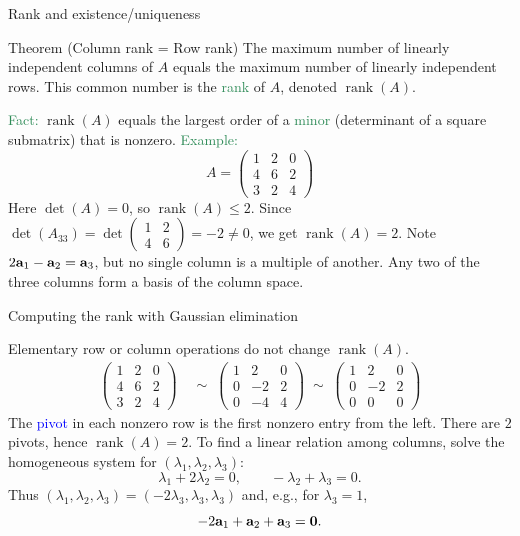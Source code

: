 \documentclass[11pt,aspectratio=169]{beamer}
\DeclareMathOperator{\rank}{rank}
\begin{document}
\begin{frame}{Rank and existence/uniqueness}
 \begin{alertblock}{Theorem (Column rank = Row rank)}
 	The maximum number of linearly independent columns of $A$ equals the maximum number of linearly independent rows. This common number is the \textcolor{SeaGreen}{rank} of $A$, denoted $\rank(A)$.
 \end{alertblock}

\vskip 6pt
\textcolor{SeaGreen}{Fact:} $\rank(A)$ equals the largest order of a \textcolor{SeaGreen}{minor} (determinant of a square submatrix) that is nonzero.
\vskip 8pt
\textcolor{SeaGreen}{Example:}
\[
A=\begin{pmatrix}
1&2&0\\
4&6&2\\
3&2&4
\end{pmatrix}
\]
Here $\det(A)=0$, so $\rank(A)\le 2$. Since $\det(A_{33})=\det\!\begin{pmatrix}1&2\\4&6\end{pmatrix}=-2\ne 0$, we get $\rank(A)=2$.
\vskip 4pt
{\tiny Note $2{\bf a}_1-{\bf a}_2={\bf a}_3$, but no single column is a multiple of another. Any two of the three columns form a basis of the column space.}
 
\end{frame}

\begin{frame}{Computing the rank with Gaussian elimination}
 
Elementary row or column operations do not change $\rank(A)$.
\vskip 6pt
\[
\begin{aligned}
\begin{pmatrix}
1&2&0\\
4&6&2\\
3&2&4
\end{pmatrix}
&\;\sim\;
\begin{pmatrix}
1&2&0\\
0&-2&2\\
0&-4&4
\end{pmatrix}
\;\sim\;
\begin{pmatrix}
1&2&0\\
0&-2&2\\
0&0&0
\end{pmatrix}
\end{aligned}
\]
The \textcolor{blue}{pivot} in each nonzero row is the first nonzero entry from the left.
\vskip 4pt
There are $2$ pivots, hence $\rank(A)=2$.
\vskip 6pt
To find a linear relation among columns, solve the homogeneous system for $(\lambda_1,\lambda_2,\lambda_3)$:
\[
\lambda_1+2\lambda_2=0,\qquad -\lambda_2+\lambda_3=0.
\]
Thus $(\lambda_1,\lambda_2,\lambda_3)=(-2\lambda_3,\lambda_3,\lambda_3)$ and, e.g., for $\lambda_3=1$,
\[
-2{\bf a}_1+{\bf a}_2+{\bf a}_3={\bf 0}.
\]
 
\end{frame}
\end{document}
